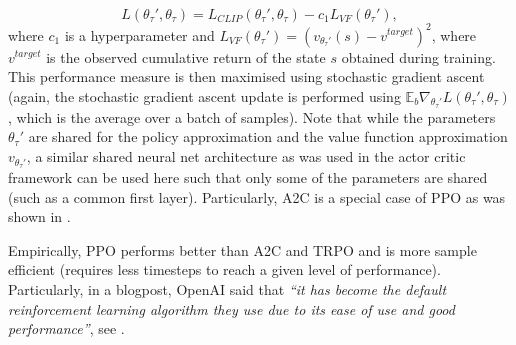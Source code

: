 \begin{equation}
\label{eq:ppo_performance_measure}
L(\theta_{\tau}', \theta_{\tau}) =  L_{CLIP}(\theta_{\tau}', \theta_{\tau}) - c_1 L_{VF}(\theta_{\tau}'),
\end{equation}
where $c_1$ is a hyperparameter and $L_{VF}(\theta_{\tau}')=(v_{\theta_{\tau}'}(s)-v^{target})^2$, where $v^{target}$ is the observed cumulative return of the state $s$ obtained during training. This performance measure is then maximised using stochastic gradient ascent (again, the stochastic gradient ascent update is performed using $\mathbb{E}_b \nabla_{\theta_{\tau}'} L(\theta_{\tau}', \theta_{\tau})$, which is the average over a batch of samples). Note that while the parameters $\theta_{\tau}'$ are shared for the policy approximation and the value function approximation $v_{\theta_{\tau}'}$, a similar shared neural net architecture as was used in the actor critic framework can be used here such that only some of the parameters are shared (such as a common first layer). Particularly, A2C is a special case of PPO as was shown in \cite{a2c_ppo_special_case}. 

Empirically, PPO performs better than A2C and TRPO and is more sample efficient (requires less timesteps to reach a given level of performance). Particularly, in a blogpost, OpenAI said that \textit{“it has become the default reinforcement learning algorithm they use due to its ease of use and good performance”}, see \cite{openaiblogpost}.

%

